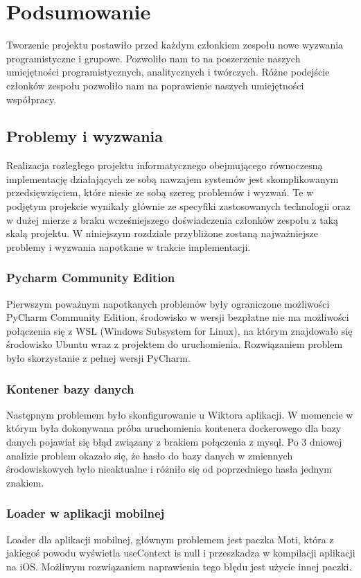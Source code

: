 \chapter{Podsumowanie}

Tworzenie projektu postawiło przed każdym członkiem zespołu nowe wyzwania programistyczne i grupowe. Pozwoliło nam to na poszerzenie naszych umiejętności programistycznych, analitycznych i twórczych. Różne podejście członków zespołu pozwoliło nam na poprawienie naszych umiejętności współpracy.

\section{Problemy i wyzwania}
Realizacja rozległego projektu informatycznego obejmującego równoczesną implementację działających ze sobą nawzajem systemów jest skomplikowanym przedsięwzięciem, które niesie ze sobą szereg problemów i wyzwań. Te w podjętym projekcie wynikały głównie ze specyfiki zastosowanych technologii oraz w dużej mierze z braku wcześniejszego doświadczenia członków zespołu z taką skalą projektu. W niniejszym rozdziale przybliżone zostaną najważniejsze problemy i wyzwania napotkane w trakcie implementacji.

\subsection{Pycharm Community Edition}
Pierwszym poważnym napotkanych problemów były ograniczone możliwości PyCharm Community Edition, środowisko w wersji bezpłatne nie ma możliwości połączenia się z WSL (Windows Subsystem for Linux), na którym znajdowało się środowisko Ubuntu wraz z projektem do uruchomienia. Rozwiązaniem problem było skorzystanie z pełnej wersji PyCharm.

\subsection{Kontener bazy danych}
Następnym problemem było skonfigurowanie u Wiktora aplikacji. W momencie w którym była dokonywana próba uruchomienia kontenera dockerowego dla bazy danych pojawiał się błąd związany z brakiem połączenia z mysql. Po 3 dniowej analizie problem okazało się, że hasło do bazy danych w zmiennych środowiskowych było nieaktualne i różniło się od poprzedniego hasła jednym znakiem.

\subsection{Loader w aplikacji mobilnej}
Loader dla aplikacji mobilnej, głównym problemem jest paczka Moti, która z jakiegoś powodu wyświetla useContext is null i przeszkadza w kompilacji aplikacji na iOS. Możliwym rozwiązaniem naprawienia tego błędu jest użycie innej paczki.

